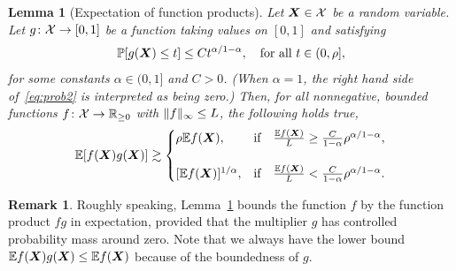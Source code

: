 \documentclass[11pt]{article}
\theoremstyle{plain}
\newtheorem{lem}{Lemma}
\theoremstyle{definition}
\newtheorem{rmk}{Remark}
\begin{document}
\begin{lem}[Expectation of function products]\label{lem:product}Let $\bm X\in \mathcal{X}$ be a random variable. Let $g\colon \mathcal{X}\to [0,1]$ be a function taking values on $[0,1]$ and satisfying
\begin{align}\label{eq:prob2}
\mathbb{P}[g(\bm X)\leq t] \leq Ct^{\alpha/1-\alpha}, \quad \text{for all }t\in(0,\rho],
\end{align} 
for some constants $\alpha\in(0,1]$ and $ C>0$. (When $\alpha=1$, the right hand side of~\eqref{eq:prob2} is interpreted as being zero.) Then, for all nonnegative, bounded functions $f\colon \mathcal{X}\to\mathbb{R}_{\geq 0}$ with $\lVert f\rVert_\infty\leq L$,  the following holds true,
\[
\mathbb{E}[f(\mX)g(\mX)]
\gtrsim \begin{cases}
\rho\mathbb{E}f(\mX), &\text{if}\quad{ \mathbb{E}f(\mX)\over L}\geq {C \over 1-\alpha} \rho^{\alpha/ 1-\alpha},\\
\\
 [\mathbb{E}f(\mX)]^{1/\alpha}, &\text{if}\quad{ \mathbb{E}f(\mX)\over L}< {C\over 1-\alpha} \rho^{\alpha /1-\alpha}.
\end{cases}
\]

\end{lem}
\begin{rmk} Roughly speaking, Lemma~\ref{lem:product} bounds the function $f$ by the function product $fg$ in expectation, provided that the multiplier $g$ has controlled probability mass around zero. Note that we always have the lower bound $\mathbb{E}f(\bm X)g(\bm X)\leq \mathbb{E}f(\bm X)$ because of the boundedness of $g$. 
\end{rmk}
\end{document}
